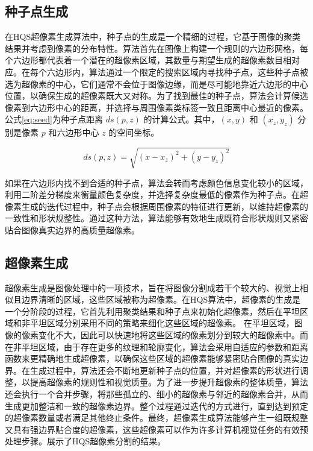 \subsection{种子点生成}
在HQS超像素生成算法中，种子点的生成是一个精细的过程，它基于图像的聚类结果并考虑到像素的分布特性。算法首先在图像上构建一个规则的六边形网格，每个六边形都代表着一个潜在的超像素区域，其数量与期望生成的超像素数目相对应。在每个六边形内，算法通过一个限定的搜索区域内寻找种子点，这些种子点被选为超像素的中心，它们通常不会位于图像边缘，而是尽可能地靠近六边形的中心位置，以确保生成的超像素既大又对称。为了找到最佳的种子点，算法会计算候选像素到六边形中心的距离，并选择与周围像素类标签一致且距离中心最近的像素。公式\eqref{eq:seed}为种子点距离 \( ds(p, z) \) 的计算公式。其中，\( (x, y) \) 和 \( (x_z, y_z) \) 分别是像素 \( p \) 和六边形中心 \( z \) 的空间坐标。

\begin{equation}
  ds(p, z) = \sqrt{(x - x_z)^2 + (y - y_z)^2}
  \label{eq:seed}
\end{equation}

如果在六边形内找不到合适的种子点，算法会转而考虑颜色信息变化较小的区域，利用二阶差分梯度来衡量颜色复杂度，并选择复杂度最低的像素作为种子点。在超像素生成的迭代过程中，种子点会根据周围像素的特征进行更新，以维持超像素的一致性和形状规整性。通过这种方法，算法能够有效地生成既符合形状规则又紧密贴合图像真实边界的高质量超像素。

\subsection{超像素生成}
超像素生成是图像处理中的一项技术，旨在将图像分割成若干个较大的、视觉上相似且边界清晰的区域，这些区域被称为超像素。在HQS算法中，超像素的生成是一个分阶段的过程，它首先利用聚类结果和种子点来初始化超像素，然后在平坦区域和非平坦区域分别采用不同的策略来细化这些区域的超像素。
在平坦区域，图像的像素变化不大，因此可以快速地将这些区域的像素划分到较大的超像素中。而在非平坦区域，由于存在更多的纹理和轮廓变化，算法会采用自适应的参数和距离函数来更精确地生成超像素，以确保这些区域的超像素能够紧密贴合图像的真实边界。在生成过程中，算法还会不断地更新种子点的位置，并对超像素的形状进行调整，以提高超像素的规则性和视觉质量。为了进一步提升超像素的整体质量，算法还会执行一个合并步骤，将那些孤立的、细小的超像素与邻近的超像素合并，从而生成更加整洁和一致的超像素边界。整个过程通过迭代的方式进行，直到达到预定的超像素数量或者满足其他终止条件。最终，超像素生成算法能够产生一组既规整又具有强边界贴合度的超像素，这些超像素可以作为许多计算机视觉任务的有效预处理步骤。展示了HQS超像素分割的结果。

